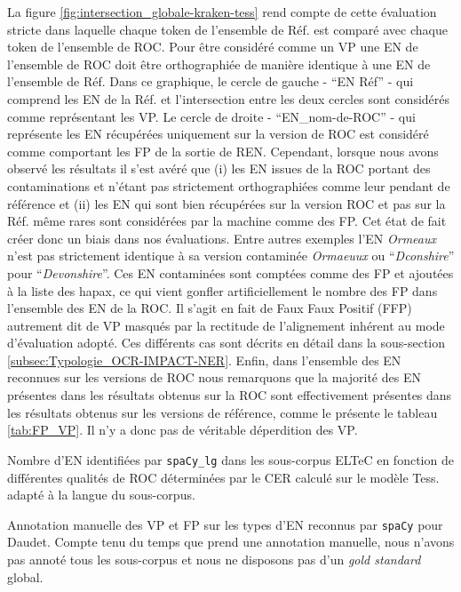 La figure \ref{fig:intersection_globale-kraken-tess} rend compte de cette évaluation stricte dans laquelle chaque token de l'ensemble de Réf. est comparé avec chaque token de l'ensemble de ROC. Pour être considéré comme un VP une EN de l'ensemble de ROC doit être orthographiée de manière identique à une EN de l'ensemble de Réf. Dans ce graphique, le cercle de gauche - ``EN Réf'' - qui comprend les EN de la Réf. et l'intersection entre les deux cercles sont considérés comme représentant les VP. Le cercle de droite - ``EN\_nom-de-ROC'' - qui représente les EN récupérées uniquement sur la version de ROC est considéré comme comportant les FP de la sortie de REN. Cependant, lorsque nous avons observé les résultats il s'est avéré que (i) les EN issues de la ROC portant des contaminations et n'étant pas strictement orthographiées comme leur pendant de référence et (ii) les EN qui sont bien récupérées sur la version ROC et pas sur la Réf. même rares sont considérées par la machine comme des FP. Cet état de fait créer donc un biais dans nos évaluations. Entre autres exemples l'EN \textit{Ormeaux} n'est pas strictement identique à sa version contaminée \textit{Ormaeuux} ou ``\textit{Dconshire}'' pour ``\textit{Devonshire}''. Ces EN contaminées sont comptées comme des FP et ajoutées à la liste des hapax, ce qui vient gonfler artificiellement le nombre des FP dans l'ensemble des EN de la ROC. Il s'agit en fait de Faux Faux Positif (FFP) autrement dit de VP masqués par la rectitude de l'alignement inhérent au mode d'évaluation adopté. Ces différents cas sont décrits en détail dans la sous-section \ref{subsec:Typologie_OCR-IMPACT-NER}.
 Enfin, dans l'ensemble des EN reconnues sur les versions de ROC nous remarquons que la majorité des EN présentes dans les résultats obtenus sur la ROC sont effectivement présentes dans les résultats obtenus sur les versions de référence, comme le présente le tableau \ref{tab:FP_VP}. Il n'y a donc pas de véritable déperdition des VP.

\begin{table}[h!]
    \centering
    \small
    
    \caption{Nombre d'EN identifiées par \texttt{spaCy\_lg} dans les sous-corpus ELTeC  en fonction de différentes qualités de ROC déterminées par le CER calculé sur le modèle Tess. adapté à la langue du sous-corpus. 
    }
    \label{tab:ELTeC_bon_mauvais}
\end{table}

\begin{table}[h!]
\small
    \centering
    
    \caption{Annotation manuelle des VP et FP sur les types d'EN reconnus par \texttt{spaCy} pour Daudet. Compte tenu du temps que prend une annotation manuelle, nous n'avons pas annoté tous les sous-corpus et nous ne disposons pas d'un \textit{gold standard} global.}
    \label{tab:FP_VP}
\end{table}




